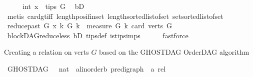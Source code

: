 \begin{isabellebody}
\ \ \isamarkupfalse%
\ \isamarkupfalse%
\ in{\isacharunderscore}{\kern0pt}t{\isacharcolon}{\kern0pt}\ {\isachardoublequoteopen}x\ {\isasymin}\ tips\ G{\isachardoublequoteclose}\ \isamarkupfalse%
\ bD\isanewline
\ \ \ \ \isamarkupfalse%
\ {\isacharparenleft}{\kern0pt}metis\ card{\isacharunderscore}{\kern0pt}gt{\isacharunderscore}{\kern0pt}{}{\isacharunderscore}{\kern0pt}iff\ length{\isacharunderscore}{\kern0pt}pos{\isacharunderscore}{\kern0pt}if{\isacharunderscore}{\kern0pt}in{\isacharunderscore}{\kern0pt}set\ length{\isacharunderscore}{\kern0pt}sorted{\isacharunderscore}{\kern0pt}list{\isacharunderscore}{\kern0pt}of{\isacharunderscore}{\kern0pt}set\ set{\isacharunderscore}{\kern0pt}sorted{\isacharunderscore}{\kern0pt}list{\isacharunderscore}{\kern0pt}of{\isacharunderscore}{\kern0pt}set{\isacharparenright}{\kern0pt}\ \isanewline
\ \ \isamarkupfalse%
\ \isamarkupfalse%
\ {\isachardoublequoteopen}{\isacharparenleft}{\kern0pt}{\isacharparenleft}{\kern0pt}reduce{\isacharunderscore}{\kern0pt}past\ G\ x{\isacharcomma}{\kern0pt}\ k{\isacharparenright}{\kern0pt}{\isacharcomma}{\kern0pt}\ G{\isacharcomma}{\kern0pt}\ k{\isacharparenright}{\kern0pt}\ {\isasymin}\ measure\ {\isacharparenleft}{\kern0pt}{\isasymlambda}{\isacharparenleft}{\kern0pt}G{\isacharcomma}{\kern0pt}\ k{\isacharparenright}{\kern0pt}{\isachardot}{\kern0pt}\ card\ {\isacharparenleft}{\kern0pt}verts\ G{\isacharparenright}{\kern0pt}{\isacharparenright}{\kern0pt}{\isachardoublequoteclose}\isanewline
\ \ \ \ \isamarkupfalse%
\ blockDAG{\isachardot}{\kern0pt}reduce{\isacharunderscore}{\kern0pt}less\ bD\ tips{\isacharunderscore}{\kern0pt}def\ is{\isacharunderscore}{\kern0pt}tip{\isachardot}{\kern0pt}simps\isanewline
\ \ \ \ \isamarkupfalse%
\ fastforce\ \ \isanewline
{}\isamarkupfalse%
%
\endisatagproof
{\isafoldproof}%
%
\isadelimproof
%
\endisadelimproof
%
\begin{isamarkuptext}%
Creating a relation on verts $G$ based on the GHOSTDAG OrderDAG algorithm%
\end{isamarkuptext}\isamarkuptrue%
\isamarkupfalse%
\ GHOSTDAG\ {\isacharcolon}{\kern0pt}{\isacharcolon}{\kern0pt}\ {\isachardoublequoteopen}\ nat\ {\isasymRightarrow}\ {\isacharparenleft}{\kern0pt}{\isacharprime}{\kern0pt}a{\isacharcolon}{\kern0pt}{\isacharcolon}{\kern0pt}linorder{\isacharcomma}{\kern0pt}{\isacharprime}{\kern0pt}b{\isacharparenright}{\kern0pt}\ pre{\isacharunderscore}{\kern0pt}digraph\ {\isasymRightarrow}\ {\isacharprime}{\kern0pt}a\ rel{\isachardoublequoteclose}\isanewline

\end{isabellebody}
